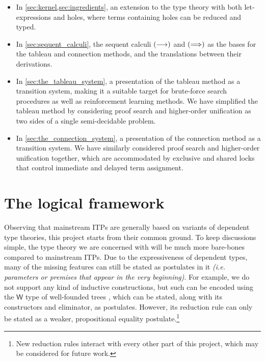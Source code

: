 \documentclass[twoside]{report}
\begin{document}
\begin{itemize}
    \item In \cref{sec:kernel,sec:ingredients}, an extension to the type theory with both let-expressions and holes, where terms containing holes can be reduced and typed.

    \item In \cref{sec:sequent_calculi}, the sequent calculi $(\longrightarrow)$ and $(\Longrightarrow)$ as the bases for the tableau and connection methods, and the translations between their derivations.

    \item In \cref{sec:the_tableau_system}, a presentation of the tableau method as a transition system, making it a suitable target for brute-force search procedures as well as reinforcement learning methods. We have simplified the tableau method by considering proof search and higher-order unification as two sides of a single semi-decidable problem.

    \item In \cref{sec:the_connection_system}, a presentation of the connection method as a transition system. We have similarly considered proof search and higher-order unification together, which are accommodated by exclusive and shared locks that control immediate and delayed term assignment.
\end{itemize}

\chapter{The logical framework}
\label{sec:logical_framework}

Observing that mainstream ITPs are generally based on variants of dependent type theories, this project starts from their common ground. To keep discussions simple, the type theory we are concerned with will be much more bare-bones compared to mainstream ITPs. Due to the expressiveness of dependent types, many of the missing features can still be stated as postulates in it \emph{(i.e. parameters or premises that appear in the very beginning)}. For example, we do not support any kind of inductive constructions, but such can be encoded using the $\mathsf W$ type of well-founded trees \cite{hugunin2021not}, which can be stated, along with its constructors and eliminator, as postulates. However, its reduction rule can only be stated as a weaker, propositional equality postulate.\footnote{New reduction rules interact with every other part of this project, which may be considered for future work.}
\end{document}

